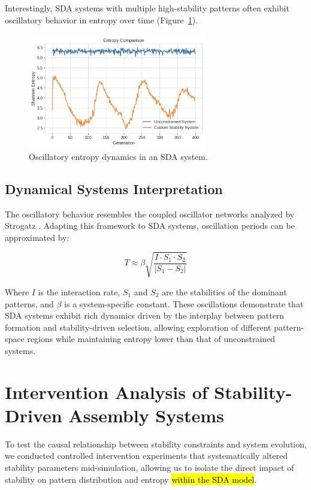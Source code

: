 \documentclass[preprint,12pt]{elsarticle}
\newcommand{\added}[1]{\hl{#1}}
\begin{document}
Interestingly, SDA systems with multiple high-stability patterns often exhibit oscillatory behavior in entropy over time (Figure~\ref{fig:figure_5}).

\begin{figure}[H]
    \centering
    \includegraphics[width=0.7\textwidth]{figure_5}
    \caption{Oscillatory entropy dynamics in an SDA system.}
    \label{fig:figure_5}
\end{figure}

\subsection{Dynamical Systems Interpretation}

The oscillatory behavior resembles the coupled oscillator networks analyzed by Strogatz \cite{strogatz2001exploring}. Adapting this framework to SDA systems, oscillation periods can be approximated by:

\begin{equation}
T \approx \beta \sqrt{\frac{I \cdot S_1 \cdot S_2}{|S_1 - S_2|}}
\end{equation}

Where $I$ is the interaction rate, $S_1$ and $S_2$ are the stabilities of the dominant patterns, and $\beta$ is a system-specific constant. These oscillations demonstrate that SDA systems exhibit rich dynamics driven by the interplay between pattern formation and stability-driven selection, allowing exploration of different pattern-space regions while maintaining entropy lower than that of unconstrained systems.



\section{Intervention Analysis of Stability-Driven Assembly Systems}

To test the causal relationship between stability constraints and system evolution, we conducted controlled intervention experiments that systematically altered stability parameters mid-simulation, allowing us to isolate the direct impact of stability on pattern distribution and entropy \added{within the SDA model}.
\end{document}
